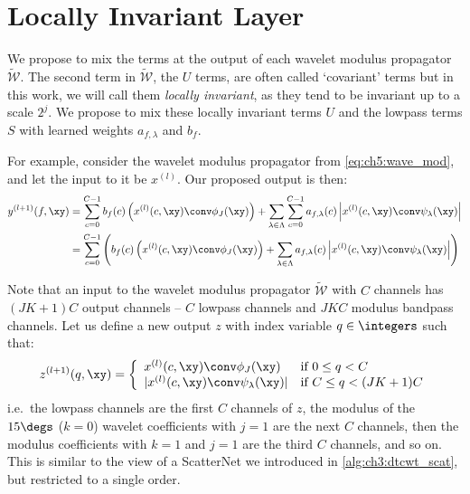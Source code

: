 \section{Locally Invariant Layer} \label{sec:ch5:method}
We propose to mix the terms at the output of each wavelet modulus propagator
$\widetilde{\mathcal{W}}$. The second term in $\widetilde{\mathcal{W}}$, the $U$
terms, are often called `covariant' terms but in this work, we will call them
\emph{locally invariant}, as they tend to be invariant up to a scale $2^j$. We propose
to mix these locally invariant terms $U$ and the lowpass terms $S$ with learned
weights $a_{f,\lambda}$ and $b_f$. 

For example, consider the wavelet modulus propagator from
\eqref{eq:ch5:wave_mod}, and let the input to it be $x^{(l)}$. Our proposed
output is then:
%
\begin{align} \label{eq:ch5:comb1}
  y^{(l+1)}(f, \xy)  &= \sum_{c=0}^{C-1} b_f(c)\left(x^{(l)}(c, \xy) \conv \phi_J(\xy)\right) + 
                        \sum_{\lambda\in \Lambda} \sum_{c=0}^{C-1} a_{f, \lambda}(c) 
                        \left|x^{(l)}(c, \xy)\conv \psi_\lambda(\xy)\right| \\
                     &=\sum_{c=0}^{C-1} \left( b_f(c)\left(x^{(l)}(c, \xy) \conv \phi_J(\xy)\right) + 
                     \sum_{\lambda\in \Lambda} a_{f, \lambda}(c) \left|x^{(l)}(c, \xy)\conv \psi_\lambda(\xy)\right|\right) \label{eq:ch5:layer}
\end{align}

Note that an input to the wavelet modulus propagator $\widetilde{\mathcal{W}}$ with $C$ channels
has $(JK+1)C$ output channels -- $C$ lowpass channels and $JKC$ modulus bandpass
channels. Let us define a new output $z$ with index variable $q\in \integers$ such that:
%
\begin{equation}
  z^{(l+1)}(q, \xy) =  \left\{
    \begin{array}{ll}
      x^{(l)}(c, \xy) \conv \phi_J(\xy) & \mbox{if } 0 \leq q < C \\
      |x^{(l)}(c, \xy)\conv \psi_\lambda(\xy)| & \mbox{if }	C \leq q < (JK+1)C
    \end{array}
    \right. \label{eq:ch5:z}
\end{equation}
i.e.\ the lowpass channels are the first $C$ channels of $z$, the modulus of the
$15\degs$ ($k=0$) wavelet coefficients with $j=1$ are the next $C$ channels,
then the modulus coefficients with $k=1$ and $j=1$ are the third $C$ channels,
and so on. This is similar to the view of a ScatterNet we introduced in \autoref{alg:ch3:dtcwt_scat},
but restricted to a single order.

